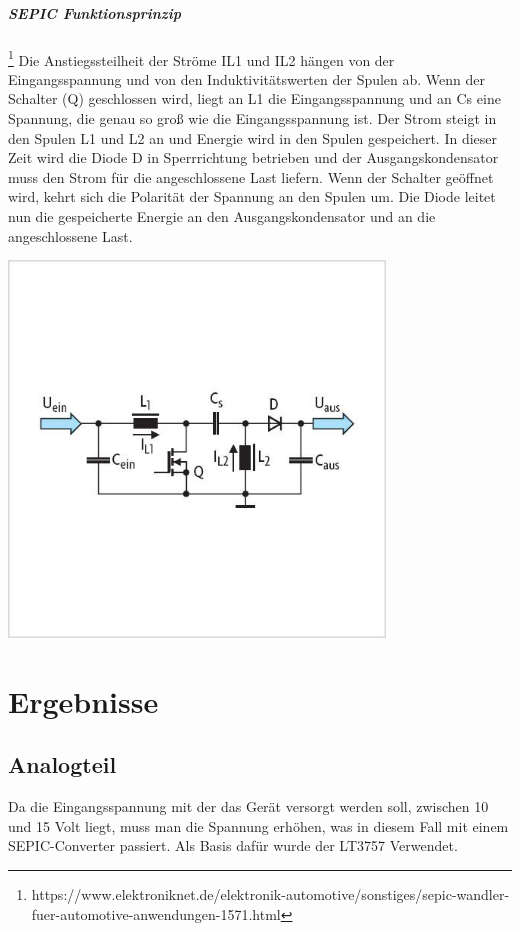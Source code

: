 \documentclass[paper=a4, 12pt]{scrreprt}
\begin{document}
	\paragraph{SEPIC Funktionsprinzip}\footnote{https://www.elektroniknet.de/elektronik-automotive/sonstiges/sepic-wandler-fuer-automotive-anwendungen-1571.html}\hfill \break
	Die Anstiegssteilheit der Ströme IL1 und IL2 hängen von der Eingangsspannung und von den Induktivitätswerten der Spulen ab. Wenn der Schalter (Q) geschlossen wird, liegt an L1 die Eingangsspannung und an Cs eine Spannung, die genau so groß wie die Eingangsspannung ist. Der Strom steigt in den Spulen L1 und L2 an und Energie wird in den Spulen gespeichert. In dieser Zeit wird die Diode D in Sperrrichtung betrieben und der Ausgangskondensator muss den Strom für die angeschlossene Last liefern. Wenn der Schalter geöffnet wird, kehrt sich die Polarität der Spannung an den Spulen um. Die Diode leitet nun die gespeicherte Energie an den Ausgangskondensator und an die angeschlossene Last.
	\begin{adjustbox}{center,caption={Prinzipschaltung eines SEPIC-Converters},label={fig:SEPIC-Prinzipschaltung},nofloat=figure,vspace=\bigskipamount}
		\includegraphics[height=10cm]{img/SEPIC_PRinzipschaltung.jpg}
	\end{adjustbox}
	
\chapter{Ergebnisse}
	\section{Analogteil}
	Da die Eingangsspannung mit der das Gerät versorgt werden soll, zwischen 10 und 15 Volt liegt, muss man die Spannung erhöhen, was in diesem Fall mit einem SEPIC-Converter passiert. Als Basis dafür wurde der LT3757 Verwendet. 
	
\end{document}
